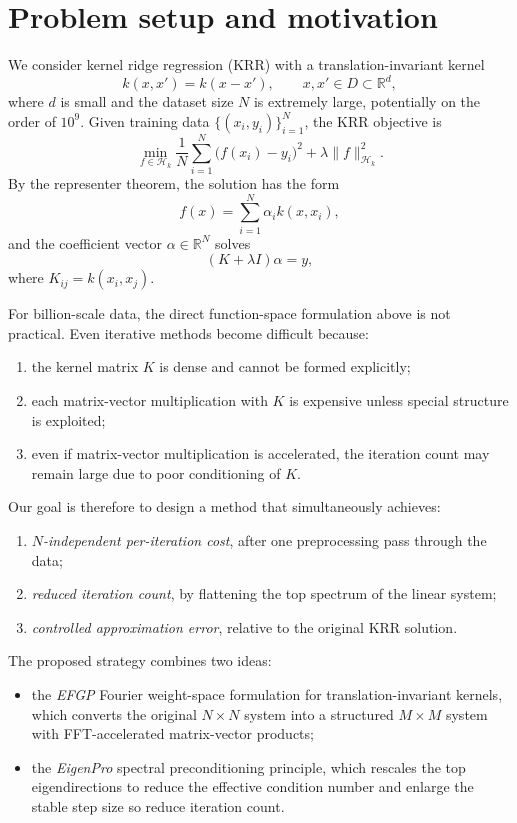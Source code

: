 \documentclass{article}
\begin{document}
\section{Problem setup and motivation}

We consider kernel ridge regression (KRR) with a translation-invariant kernel
\[
k(x,x') = k(x-x'), \qquad x,x' \in D \subset \mathbb{R}^d,
\]
where \(d\) is small and the dataset size \(N\) is extremely large, potentially on the order of \(10^9\).
Given training data \(\{(x_i,y_i)\}_{i=1}^N\), the KRR objective is
\[
\min_{f \in \mathcal{H}_k}
\frac{1}{N}\sum_{i=1}^N \bigl(f(x_i)-y_i\bigr)^2 + \lambda \|f\|_{\mathcal{H}_k}^2.
\]
By the representer theorem, the solution has the form
\[
f(x)=\sum_{i=1}^N \alpha_i k(x,x_i),
\]
and the coefficient vector \(\alpha\in\mathbb{R}^N\) solves
\[
(K+\lambda I)\alpha = y,
\]
where \(K_{ij}=k(x_i,x_j)\).



For billion-scale data, the direct function-space formulation above is not practical. Even iterative methods become difficult because:
\begin{enumerate}
    \item the kernel matrix \(K\) is dense and cannot be formed explicitly;
    \item each matrix-vector multiplication with \(K\) is expensive unless special structure is exploited;
    \item even if matrix-vector multiplication is accelerated, the iteration count may remain large due to poor conditioning of \(K\).
\end{enumerate}

Our goal is therefore to design a method that simultaneously achieves:
\begin{enumerate}
    \item \emph{\(N\)-independent per-iteration cost}, after one preprocessing pass through the data;
    \item \emph{reduced iteration count}, by flattening the top spectrum of the linear system;
    \item \emph{controlled approximation error}, relative to the original KRR solution.
\end{enumerate}

The proposed strategy combines two ideas:
\begin{itemize}
    \item the \emph{EFGP} Fourier weight-space formulation for translation-invariant kernels, which converts the original \(N\times N\) system into a structured \(M\times M\) system with FFT-accelerated matrix-vector products;
    \item the \emph{EigenPro} spectral preconditioning principle, which rescales the top eigendirections to reduce the effective condition number and enlarge the stable step size so reduce iteration count.
\end{itemize}
\end{document}
